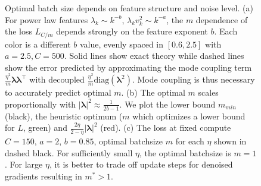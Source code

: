 \documentclass{article} %
\begin{document}
\begin{figure}[t]
    \centering
    \caption{Optimal batch size depends on feature structure and noise level. (a) For power law features $\lambda_k \sim k^{-b}$, $\lambda_k v_k^2 \sim k^{-a}$, the $m$ dependence of the loss $L_{C/m}$ depends strongly on the feature exponent $b$. Each color is a different $b$ value, evenly spaced in $[0.6,2.5]$ with $a=2.5, C=500$. Solid lines show exact theory while dashed lines show the error predicted by approximating the mode coupling term $\frac{\eta^2}{m} \bm\lambda\bm\lambda^\top$ with decoupled $\frac{\eta^2}{m} \text{diag}(\bm\lambda^2)$. Mode coupling is thus necessary to accurately predict optimal $m$. (b) The optimal $m$ scales proportionally with $|\bm\lambda|^2 \approx \frac{1}{2b-1}$. We plot the lower bound $m_{min}$ (black), the heuristic optimum  ($m$ which optimizes a lower bound for $L$, green) and $\frac{2 \eta}{2-\eta}|\bm\lambda|^2$ (red). (c) The loss at fixed compute $C=150$, $a=2$, $b=0.85$, optimal batchsize $m$ for each $\eta$ shown in dashed black. For sufficiently small $\eta$, the optimal batchsize is $m=1$. For large $\eta$, it is better to trade off update steps for denoised gradients resulting in $m^* > 1$.  }
    \label{fig:optimal_batch_size}
\end{figure}
\end{document}
